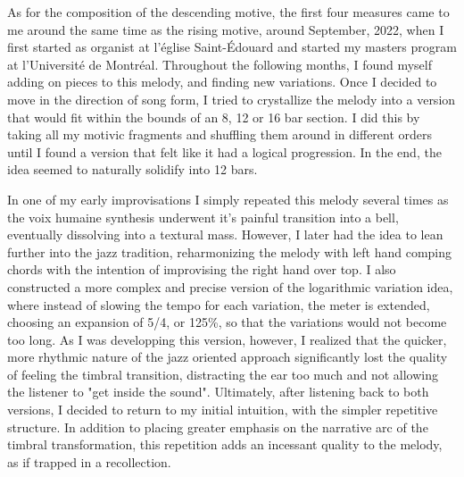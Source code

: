 \documentclass[12pt,twoside,maitrise]{dms_ks}
\theoremstyle{definition}
\begin{document}
{

As for the composition of the descending motive, the first four measures came to me around the same time as the rising motive, around September, 2022, when I first started as organist at l'église Saint-Édouard and started my masters program at l'Université de Montréal.  
Throughout the following months, I found myself adding on pieces to this melody, and finding new variations.  
Once I decided to move in the direction of song form, I tried to crystallize the melody into a version that would fit within the bounds of an 8, 12 or 16 bar section. 
I did this by taking all my motivic fragments and shuffling them around in different orders until I found a version that felt like it had a logical progression.  
In the end, the idea seemed to naturally solidify into 12 bars.

In one of my early improvisations I simply repeated this melody several times as the voix humaine synthesis underwent it's painful transition into a bell, eventually dissolving into a textural mass.
However, I later had the idea to lean further into the jazz tradition, reharmonizing the melody with left hand comping chords with the intention of improvising the right hand over top. 
I also constructed a more complex and precise version of the logarithmic variation idea, where instead of slowing the tempo for each variation, the meter is extended, choosing an expansion of 5/4, or 125\%, so that the variations would not become too long. 
As I was developping this version, however, I realized that the quicker, more rhythmic nature of the jazz oriented approach significantly lost the quality of feeling the timbral transition, distracting the ear too much and not allowing the listener to "get inside the sound". 
Ultimately, after listening back to both versions, I decided to return to my initial intuition, with the simpler repetitive structure. 
In addition to placing greater emphasis on the narrative arc of the timbral transformation, this repetition adds an incessant quality to the melody, as if trapped in a recollection.


}
\end{document}
